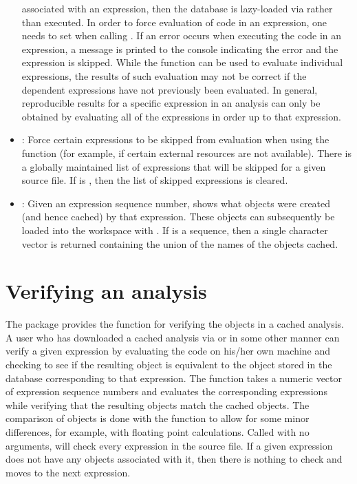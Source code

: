 \documentclass[nojss]{jss}
\begin{document}
\begin{itemize}
associated with an expression, then the database is lazy-loaded via
 rather than executed.  In order to force evaluation
of code in an expression, one needs to set  when
calling .  If an error occurs when executing the code in
an expression, a message is printed to the console indicating the
error and the expression is skipped.  While the 
function can be used to evaluate individual expressions, the results
of such evaluation may not be correct if the dependent expressions
have not previously been evaluated.  In general, reproducible results
for a specific expression in an analysis can only be obtained by
evaluating all of the expressions in order up to that expression.
\item
{}: Force certain expressions to be skipped from
evaluation when using the  function (for example, if
certain external resources are not available).  There is a globally
maintained list of expressions that will be skipped for a given source
file.  If  is , then the list of skipped
expressions is cleared.
\item
{}: Given an expression sequence number,
 shows what objects were created (and hence cached)
by that expression.  These objects can subsequently be loaded into the
workspace with .  If  is a sequence, then a
single character vector is returned containing the union of the names
of the objects cached.
\end{itemize}





\section{Verifying an analysis}
\label{sec:verify}


The  package provides the  function for
verifying the objects in a cached analysis.  A user who has downloaded
a cached analysis via  or in some other manner can
verify a given  expression by evaluating the code on
his/her own machine and checking to see if the resulting object is
equivalent to the object stored in the database corresponding to that
expression.  The  function takes a numeric vector of
expression sequence numbers and evaluates the corresponding
expressions while verifying that the resulting objects match the
cached objects.  The comparison of objects is done with the
 function to allow for some minor differences, for
example, with floating point calculations.  Called with no arguments,
 will check every expression in the source file.  If a
given expression does not have any  objects associated
with it, then there is nothing to check and  moves to
the next expression.
\end{document}
